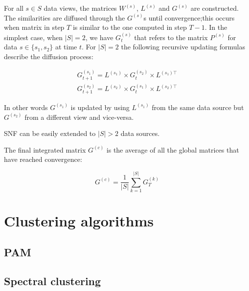 For all $s\in S$ data views, the matrices $W^{(s)}$, $L^{(s)}$ and $G^{(s)}$ are constructed. The similarities are diffused through the $G^{(s)}$s until convergence;this occurs when matrix in step $T$ is similar to the one computed in step $T-1$.  
In the simplest case, when $|S|=2$, we have $G_t^{(s)}$ that refers to the matrix $P^{(s)}$ for data $s \in \{ s_1,s_2\}$ at time $t$.
For $|S|=2$ the following recursive updating formulas describe the diffusion process:

\begin{equation}
    \label{eq:update}
    \begin{aligned}
        G^{(s_1)}_{t+1}=L^{(s_1)} \times G^{(s_2)}_{t} \times L^{(s_1)\top} \\
        G^{(s_2)}_{t+1}=L^{(s_2)} \times G^{(s_1)}_{t} \times L^{(s_2)\top}  
    \end{aligned}
\end{equation}

In other words $G^{(s_1)}$ is updated by using $L^{(s_1)}$ from the same data source but $G^{(s_2)}$ from a different view and vice-versa.

SNF can be easily extended to $|S| > 2$ data sources. \newline


The final integrated matrix $G^{(c)}$ is the average of all the global matrices that have reached convergence:

\begin{equation}
    \label{eq:consensus}
    G^{(c)} = \frac{1}{|S|} \sum_{k=1}^{|S|} G_T^{(k)}
\end{equation}


\section{Clustering algorithms}\label{methods_clustering}
\subsection{PAM}\label{clustering_PAM}
\subsection{Spectral clustering}\label{clustering_spectral}